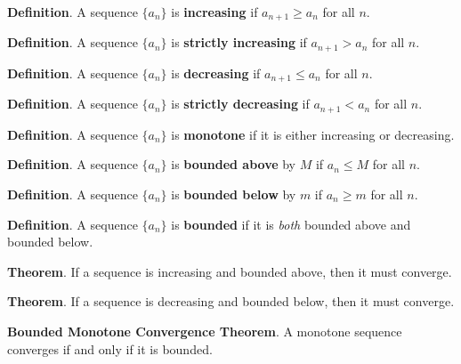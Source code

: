 \documentclass{exam}[12pt]
\begin{document}
\pagestyle{head}


\vspace{.6in}
\large{

\textbf{Definition}.  A sequence $\{a_n\}$ is \textbf{increasing} if $a_{n+1} \geq a_n$ for all $n$.
\vspace{.4in}

\textbf{Definition}.  A sequence $\{a_n\}$ is \textbf{strictly increasing} if $a_{n+1} > a_n$ for all $n$.
\vspace{.4in}

\textbf{Definition}.  A sequence $\{a_n\}$ is \textbf{decreasing} if $a_{n+1} \leq a_n$ for all $n$.
\vspace{.4in}

\textbf{Definition}.  A sequence $\{a_n\}$ is \textbf{strictly decreasing} if $a_{n+1} < a_n$ for all $n$.
\vspace{.4in}

\textbf{Definition}.  A sequence $\{a_n\}$ is \textbf{monotone} if it is either increasing or decreasing.
\vspace{.4in}

\textbf{Definition}.  A sequence $\{a_n\}$ is \textbf{bounded above} by $M$ if $a_n\leq M$ for all $n$.
\vspace{.4in}

\textbf{Definition}.  A sequence $\{a_n\}$ is \textbf{bounded below} by $m$ if $a_n\geq m$ for all $n$.
\vspace{.4in}

\textbf{Definition}.  A sequence $\{a_n\}$ is \textbf{bounded} if it is \emph{both} bounded above and bounded below.
\vspace{.6in}

\textbf{Theorem}.  If a sequence is increasing and bounded above, then it must converge.
\vspace{.4in}

\textbf{Theorem}.  If a sequence is decreasing and bounded below, then it must converge.
\vspace{.4in}

\textbf{Bounded Monotone Convergence Theorem}. A monotone sequence converges if and \hspace*{.5in} only if it is bounded.
\vspace{.4in}







}
\end{document}
